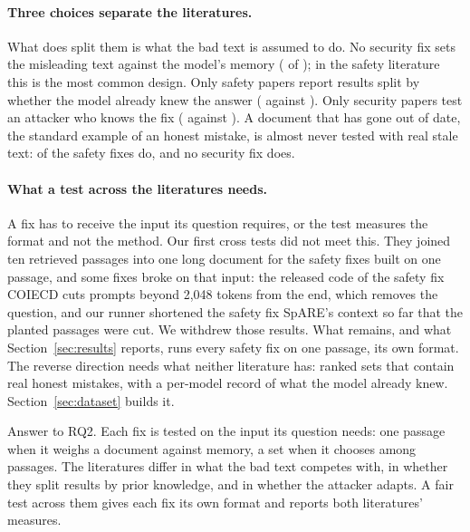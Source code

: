 \paragraph{Three choices separate the literatures.} What does split them is
what the bad text is assumed to do. No security fix sets the misleading text
against the model's memory (\NDesignMemSec{} of \NDesignSec{}); in the
safety literature this is the most common design. Only safety papers report
results split by whether the model already knew the answer
(\NDesignSplitSaf{} against \NDesignSplitSec{}). Only security papers test an
attacker who knows the fix (\NDesignAdaptSec{} against
\NDesignAdaptSaf{}). A document that has gone out of date, the standard example of an honest
mistake, is almost never tested with real stale text: \NDesignOutdated{} of the \NDesignSaf{} safety fixes do, and no
security fix does.

\paragraph{What a test across the literatures needs.} A fix has to receive
the input its question requires, or the test measures the format and not the
method. Our first cross tests did not meet this. They joined ten retrieved
passages into one long document for the safety fixes built on one passage,
and some fixes broke on that input: the released code of the safety fix
COIECD cuts prompts beyond 2,048 tokens from the end, which removes the
question, and our runner shortened the safety fix SpARE's context so far that
the planted passages were cut. We withdrew those results. What remains, and
what Section~\ref{sec:results} reports, runs every safety fix on one
passage, its own format. The reverse direction needs what neither literature
has: ranked sets that contain real honest mistakes, with a per-model record
of what the model already knew. Section~\ref{sec:dataset} builds it.

Answer to RQ2. Each fix is tested on the input its question needs: one
passage when it weighs a document against memory, a set when it chooses
among passages. The literatures differ in what the bad text competes with,
in whether they split results by prior knowledge, and in whether the
attacker adapts. A fair test across them gives each fix its own format and
reports both literatures' measures.
